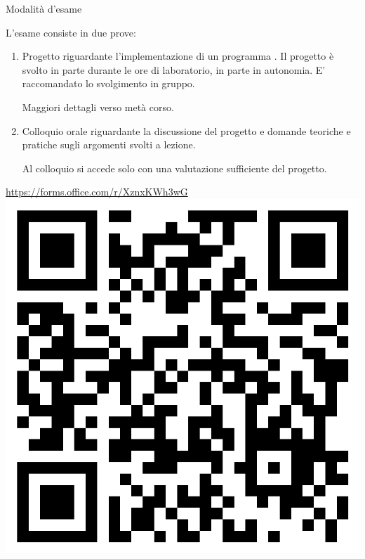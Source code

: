 \begin{frame}{Modalità d'esame}

  L'esame consiste in due prove:

  \begin{enumerate}

  \item Progetto riguardante l'implementazione di un programma \Cpp{}. Il progetto
    è svolto in parte durante le ore di laboratorio, in parte in autonomia. E'
    raccomandato lo svolgimento in gruppo.

    Maggiori dettagli verso metà corso.

  \item Colloquio orale riguardante la discussione del progetto e domande
    teoriche e pratiche sugli argomenti svolti a lezione.

    Al colloquio si accede solo con una valutazione sufficiente del progetto.

  \end{enumerate}

\end{frame}

\begin{frame}
  \begin{center}
    \vfill
    \url{https://forms.office.com/r/XznxKWh3wG}
    \vfill
    \includegraphics[height=.5\textheight]{images/sondaggio-qr.png}
    \vfill
  \end{center}
\end{frame}

